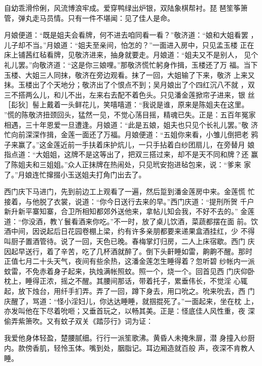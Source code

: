 自幼乖滑伶俐，风流博浪牢成。爱穿鸭绿出炉银，双陆象棋帮衬。琵
琶笙筝箫管，弹丸走马员情。只有一件不堪闻：见了佳人是命。

月娘便道：“既是姐夫会看牌，何不进去咱同看一看？”敬济道：“娘和大姐看罢
，儿子却不当。”月娘道：“姐夫至亲间，怕怎的？”一面进入房中，只见孟玉楼
正在床上铺茜红毡看牌，见敬济进来，抽身就要走。月娘道：“姐夫又不是别人，
见个礼儿罢。”向敬济道：“这是你三娘哩。”那敬济慌忙躬身作揖，玉楼还了万
福。当下玉楼、大姐三人同抹，敬济在旁边观看。抹了一回，大姐输了下来，敬济
上来又抹。玉楼出了个天地分；敬济出了个恨点不到；吴月娘出了个四红沉八不就
，双三不搭两么儿，和儿不出，左来右去配不着色头。只见潘金莲掀帘子进来，银
丝［髟狄］髻上戴着一头鲜花儿，笑嘻嘻道：“我说是谁，原来是陈姐夫在这里。
”慌的陈敬济扭颈回头，猛然一见，不觉心荡目摇，精魂已失。正是：五百年冤家
相遇，三十年恩爱一旦遭逢。月娘道：“此是五娘，姐夫也只见个长礼儿罢。”敬
济忙向前深深作揖，金莲一面还了万福。月娘便道：“五姐你来看，小雏儿倒把老
鸦子来赢了。”这金莲近前一手扶着床护炕儿，一只手拈着白纱团扇儿，在旁替月
娘指点道：“大姐姐，这牌不是这等出了，把双三搭过来，却不是天不同和牌？还
赢了陈姐夫和三姐姐。”众人正抹牌在热闹处，只见玳安抱进毡包来，说：“爹来
家了。”月娘连忙撺掇小玉送姐夫打角门出去了。

西门庆下马进门，先到前边工上观看了一遍，然后踅到潘金莲房中来。金莲慌
忙接着，与他脱了衣裳，说道：“你今日送行去来的早。”西门庆道：“提刑所贺
千户新升新平寨知寨，合卫所相知都郊外送他来，拿帖儿知会我，不好不去的。”
金莲道：“你没酒，教丫鬟看酒来你吃。”不一时，放了桌儿饮酒，菜蔬都摆在面
前。饮酒中间，因说起后日花园卷棚上梁，约有许多亲朋都要来递果盒酒挂红，少
不得叫厨子置酒管待。说了一回，天色已晚。春梅掌灯归房，二人上床宿歇。西门
庆因起早送行，着了辛苦，吃了几杯酒就醉了。倒下头鼾睡如雷，齁齁不醒。那时
正值七月二十头天气，夜间有些余热，这潘金莲怎生睡得着？忽听碧
纱帐内一派蚊雷，不免赤着身子起来，执烛满帐照蚊。照一个，烧一个。回首见西
门庆仰卧枕上，睡得正浓，摇之不醒。其腰间那话，带着托子，累垂伟长，不觉淫
心辄起，放下烛台，用纤手扪弄。弄了一回，蹲下身去，用口吮之。吮来吮去，西
门庆醒了，骂道：“怪小淫妇儿，你达达睡睡，就掴掍死了。”一面起来，坐在枕
上，亦发叫他在下尽着吮咂；又垂首玩之，以畅其美。正是：怪底佳人风性重，夜
深偷弄紫箫吹。又有蚊子双关《踏莎行》词为证：

我爱他身体轻盈，楚腰腻细。行行一派笙歌沸。黄昏人未掩朱扉，潜
身撞入纱厨内。款傍香肌，轻怜玉体。嘴到处，胭脂记。耳边厢造就百般
声，夜深不肯教人睡。

